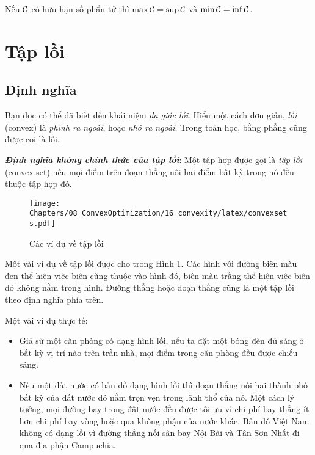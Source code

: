 Nếu $\mathcal{C}$ có hữu hạn số phẩn tử thì $\max \mathcal{C} = \sup \mathcal{C}$ và $\min \mathcal{C} = \inf \mathcal{C}$.

\section{Tập lồi}
\subsection{Định nghĩa}
Bạn đoc có thể đã biết đến khái niệm \textit{đa giác lồi}. Hiểu một cách đơn giản, \textit{lồi} (convex) là \textit{phình ra ngoài}, hoặc \textit{nhô ra ngoài}. Trong toán học,
{bằng phẳng} cũng được coi là {lồi}.

\textit{\textbf{Định nghĩa không chính thức của tập lồi}}: Một tập hợp được gọi là
\textit{tập lồi} (convex set) nếu mọi điểm trên đoạn thẳng nối hai điểm {bất kỳ} trong
nó đều thuộc tập hợp đó.


\begin{figure}[t]
\centering
\texttt{[image: Chapters/08\_ConvexOptimization/16\_convexity/latex/convexsets.pdf]}
\caption[]{Các ví dụ về tập lồi}
\label{fig:16_convexsets}
\end{figure}

Một vài ví dụ về tập lồi được cho trong Hình \ref{fig:16_convexsets}. Các hình
với đường biên màu đen thể hiện việc biên cũng thuộc vào hình đó, biên màu trắng
thể hiện việc biên đó không nằm trong hình. Đường thẳng hoặc đoạn
thẳng cũng là một tập lồi theo định nghĩa phía trên.

Một vài ví dụ thực tế:

\begin{itemize}
\item Giả sử một căn phòng có dạng hình lồi, nếu ta đặt một bóng đèn đủ
sáng ở bất kỳ vị trí nào trên trần nhà, mọi điểm trong căn phòng đều được
chiếu sáng.

\item Nếu một đất nước có bản đồ dạng hình lồi thì đoạn thẳng nối hai
thành phố bất kỳ của đất nước đó nằm trọn vẹn trong lãnh thổ của nó. Một cách lý
tưởng, mọi đường bay trong đất nước đều được tối ưu vì chi phí bay thẳng ít
hơn chi phí bay vòng hoặc qua không phận của nước khác. Bản đồ Việt
Nam không có dạng lồi vì đường thẳng nối sân bay Nội Bài và Tân Sơn Nhất đi
qua địa phận Campuchia.

\end{itemize}


